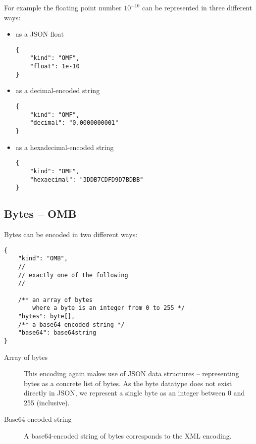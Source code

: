 For example the floating point number $10^{-10}$ can be represented in three different ways:
\begin{itemize}
    \item as a JSON float
\\\begin{minipage}{\linewidth}
\begin{lstlisting}
{
    "kind": "OMF",
    "float": 1e-10
}
\end{lstlisting}\end{minipage}
    \item as a decimal-encoded string
\\\begin{minipage}{\linewidth}
\begin{lstlisting}
{
    "kind": "OMF",
    "decimal": "0.0000000001"
}
\end{lstlisting}\end{minipage}
    \item as a hexadecimal-encoded string
\\\begin{minipage}{\linewidth}
\begin{lstlisting}
{
    "kind": "OMF",
    "hexaecimal": "3DDB7CDFD9D7BDBB"
}
\end{lstlisting}\end{minipage}
\end{itemize}

\subsection{Bytes -- OMB}

Bytes can be encoded in two different ways:
\\\begin{minipage}{\linewidth}
\begin{lstlisting}
{
    "kind": "OMB",
    //
    // exactly one of the following
    //

    /** an array of bytes
        where a byte is an integer from 0 to 255 */
    "bytes": byte[],
    /** a base64 encoded string */
    "base64": base64string
}
\end{lstlisting}\end{minipage}

\begin{description}
    \item[Array of bytes]
    This encoding again makes use of JSON data structures -- representing bytes as a concrete list of bytes.
    As the byte datatype does not exist directly in JSON, we represent a single byte as an integer between 0 and 255 (inclusive). 

    \item[Base64 encoded string]
    A base64-encoded string of bytes corresponds to the XML encoding. 
\end{description}

